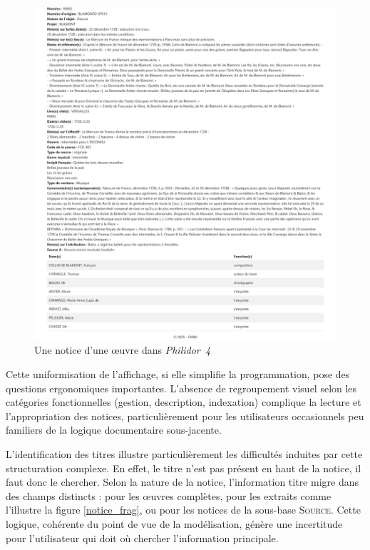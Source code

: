 \begin{center}
	\begin{figure}[p]
		\caption{Une notice d'une œuvre dans \textit{Philidor~4}} \label{notice}
		\centering
		\includegraphics[width=\textwidth]{images/Capture_ecran_notice.jpeg}
	\end{figure}
\end{center}

Cette uniformisation de l'affichage, si elle simplifie la programmation, pose des questions ergonomiques importantes. L'absence de regroupement visuel selon les catégories fonctionnelles (gestion, description, indexation) complique la lecture et l'appropriation des notices, particulièrement pour les utilisateurs occasionnels peu familiers de la logique documentaire sous-jacente.

L'identification des titres illustre particulièrement les difficultés induites par cette structuration complexe. En effet, le titre n'est pas présent en haut de la notice, il faut donc le chercher. Selon la nature de la notice, l'information titre migre dans des champs distincts :  pour les œuvres complètes,  pour les extraits comme l'illustre la figure \ref{notice_frag},  ou  pour les notices de la sous-base \textsc{Source}. Cette logique, cohérente du point de vue de la modélisation, génère une incertitude pour l'utilisateur qui doit  où chercher l'information principale.

